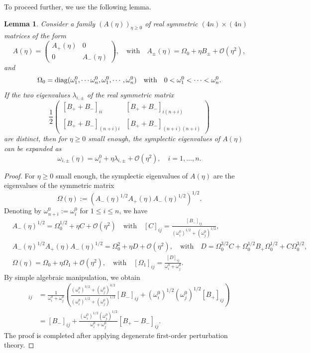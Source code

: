 \documentclass[11pt]{article}
\newtheorem{lemma}{Lemma}
\begin{document}
To proceed further, we use the following lemma.

\begin{lemma}
    Consider a family $(A(\eta))_{\eta \ge 0}$ of real symmetric $(4n) \times (4n)$ matrices of the form
    $$
A(\eta) = \left( \begin{array}{cc} A_+(\eta) & 0 \\ 0 & A_-(\eta) \end{array} \right), \quad \mbox{with} \quad A_\pm(\eta)=\Omega_0 + \eta B_\pm + \mathcal O(\eta^2), 
    $$
    and 
    $$
    \Omega_0 = {\rm diag}(\omega_1^0,\cdots \omega_n^0,\omega_1^0,\cdots,\omega_n^0) \quad \mbox{with} \quad 0 < \omega_1^0 < \cdots < \omega_n^0 .
    $$
    If the two eigenvalues $\lambda_{i,\pm}$ of the real symmetric matrix
    $$\frac12\begin{pmatrix}
        [B_++B_-]_{ii} & [B_++B_-]_{i(n+i)}\\
        [B_++B_-]_{(n+i)i} & [B_++B_-]_{(n+i)(n+i)}
    \end{pmatrix}$$
    are distinct, then for $\eta \ge 0$ small enough, the symplectic eigenvalues of $A(\eta)$ can be expanded as
    $$\omega_{i,\pm}(\eta)=\omega_i^0+\eta\lambda_{i,\pm}+\mathcal O(\eta^2),\quad i=1,\ldots,n.$$
\end{lemma}
\begin{proof}
    For $\eta \ge 0$ small enough, the symplectic eigenvalues of $A(\eta)$ are the eigenvalues of the symmetric matrix
    $$
    \Omega(\eta):=\left( A_-(\eta)^{1/2} A_+(\eta) A_-(\eta)^{1/2} \right)^{1/2}.
    $$
    Denoting by $\omega_{n+i}^0:=\omega_i^0$ for $1 \le i \le n$, we have
    \begin{align*}
    & A_-(\eta)^{1/2} = \Omega_0^{1/2} + \eta C + \mathcal O(\eta^2) \quad \mbox{with} \quad [C]_{ij}=\frac{[B_-]_{ij}}{(\omega_i^0)^{1/2}+(\omega_j^0)^{1/2}}, \\
    & A_-(\eta)^{1/2} A_+(\eta) A_-(\eta)^{1/2} = \Omega_0^2 + \eta D + \mathcal O(\eta^2), \quad \mbox{with} \quad D = \Omega_0^{3/2}C + \Omega_0^{1/2} B_+ \Omega_0^{1/2} + C \Omega_0^{3/2}, \\
    & \Omega(\eta) = \Omega_0 + \eta \Omega_1 + \mathcal O(\eta^2), \quad \mbox{with} \quad [\Omega_1]_{ij} = \frac{[D]_{ij}}{\omega_i^0+\omega_j^0}.
    \end{align*} 
    By simple algebraic manipulation, we obtain
    \begin{align*}
      [\Omega_1]_{ij} &=  \frac{1}{\omega_i^0+\omega_j^0} \left( \frac{(\omega_i^0)^{3/2} + (\omega_j^0)^{3/2}}{(\omega_i^0)^{1/2}+(\omega_j^0)^{1/2}} [B_-]_{ij} + (\omega_i^0)^{1/2} (\omega_j^0)^{1/2} [B_+]_{ij} \right) \\
      & = [B_-]_{ij} +  \frac{(\omega_i^0)^{1/2}(\omega_j^0)^{1/2}}{\omega_i^0+\omega_j^0}  [B_+-B_-]_{ij}.
    \end{align*}
   The proof is completed after applying degenerate first-order perturbation theory.
\end{proof}
\end{document}
